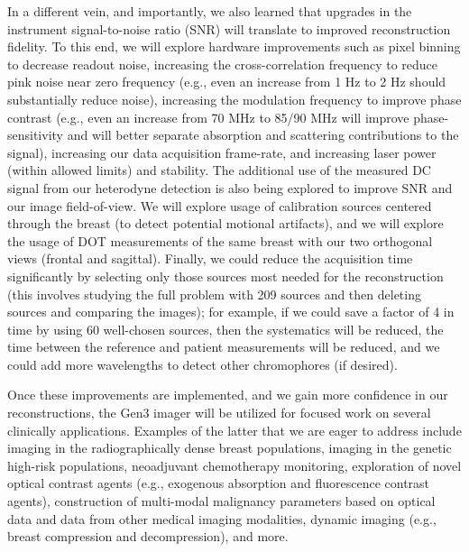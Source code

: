 In a different vein, and importantly, we also learned that upgrades in the instrument signal-to-noise ratio (SNR) will translate to improved reconstruction fidelity. To this end, we will explore hardware improvements such as pixel binning to decrease readout noise, increasing the cross-correlation frequency to reduce pink noise near zero frequency (e.g., even an increase from 1 Hz to 2 Hz should substantially reduce noise), increasing the modulation frequency to improve phase contrast (e.g., even an increase from 70 MHz to 85/90 MHz will improve phase-sensitivity and will better separate absorption and scattering contributions to the signal), increasing our data acquisition frame-rate, and increasing laser power (within allowed limits) and stability. The additional use of the measured DC signal from our heterodyne detection is also being explored to improve SNR and our image field-of-view. We will explore usage of calibration sources centered through the breast (to detect potential motional artifacts), and we will explore the usage of DOT measurements of the same breast with our two orthogonal views (frontal and sagittal). Finally, we could reduce the acquisition time significantly by selecting only those sources most needed for the reconstruction (this involves studying the full problem with 209 sources and then deleting sources and comparing the images); for example, if we could save a factor of 4 in time by using 60 well-chosen sources, then the systematics will be reduced, the time between the reference and patient measurements will be reduced, and we could add more wavelengths to detect other chromophores (if desired).

Once these improvements are implemented, and we gain more confidence in our reconstructions, the Gen3 imager will be utilized for focused work on several clinically applications. Examples of the latter that we are eager to address include imaging in the radiographically dense breast populations, imaging in the genetic high-risk populations, neoadjuvant chemotherapy monitoring, exploration of novel optical contrast agents (e.g., exogenous absorption and fluorescence contrast agents), construction of multi-modal malignancy parameters based on optical data and data from other medical imaging modalities, dynamic imaging (e.g., breast compression and decompression), and more.
